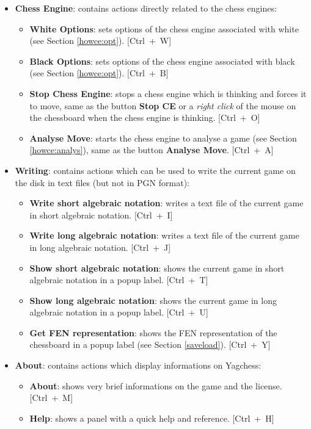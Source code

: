 \documentclass[a4paper]{article}
\newcommand{\nameprog}{Yagchess}
\begin{document}
\begin{itemize}
\item \textbf{Chess Engine}: contains actions directly related to the chess engines:
\begin{itemize}
\item \textbf{White Options}: sets options of the chess engine associated with white (see Section \ref{howce:opt}). \mbox{[Ctrl + W]}
\item \textbf{Black Options}: sets options of the chess engine associated with black (see Section \ref{howce:opt}). \mbox{[Ctrl + B]}
\item \textbf{Stop Chess Engine}: stops a chess engine which is thinking and forces it to move, same as the button \textbf{Stop CE} or a \textit{right click}
of the mouse on the chessboard when the chess engine is thinking. \mbox{[Ctrl + O]}
\item \textbf{Analyse Move}: starts the chess engine to analyse a game (see Section \ref{howce:analys}), same as the button \textbf{Analyse Move}. \mbox{[Ctrl + A]}
\end{itemize}

\item \textbf{Writing}: contains actions which can be used to write the current game on the disk in text files (but not in PGN format):
\begin{itemize}
\item \textbf{Write short algebraic notation}: writes a text file of the current game in short algebraic notation. \mbox{[Ctrl + I]}
\item \textbf{Write long algebraic notation}: writes a text file of the current game in long algebraic notation. \mbox{[Ctrl + J]}
\item \textbf{Show short algebraic notation}: shows the current game in short algebraic notation in a popup label. \mbox{[Ctrl + T]}
\item \textbf{Show long algebraic notation}: shows the current game in long algebraic notation in a popup label. \mbox{[Ctrl + U]}
\item \textbf{Get FEN representation}: shows the FEN representation of the chessboard in a popup label (see Section \ref{saveload}). \mbox{[Ctrl + Y]}
\end{itemize}

\item \textbf{About}: contains actions which display informations on \nameprog:
\begin{itemize}
\item \textbf{About}: shows very brief informations on the game and the license. \mbox{[Ctrl + M]}
\item \textbf{Help}: shows a panel with a quick help and reference. \mbox{[Ctrl + H]}
\end{itemize}

\end{itemize}
\end{document}
